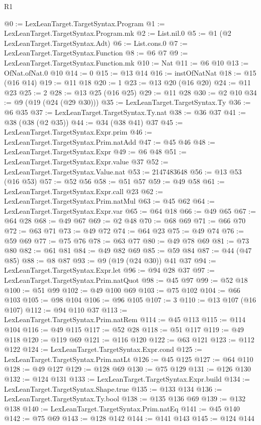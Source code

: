 \begin{lexlean}{R1}
\begin{coremodule}
@0 := LexLeanTarget.TargetSyntax.Program
@1 := LexLeanTarget.TargetSyntax.Program.mk
@2 := List.nil.{0}
@5 := @1 (@2 LexLeanTarget.TargetSyntax.Adt)
@6 := List.cons.{0}
@7 := LexLeanTarget.TargetSyntax.Function
@8 := @6 @7
@9 := LexLeanTarget.TargetSyntax.Function.mk
@10 := Nat
@11 := @6 @10
@13 := OfNat.ofNat.{0} @10
@14 := 0
@15 := @13 @14
@16 := instOfNatNat
@18 := @15 (@16 @14)
@19 := @11 @18
@20 := 1
@23 := @13 @20 (@16 @20)
@24 := @11 @23
@25 := 2
@28 := @13 @25 (@16 @25)
@29 := @11 @28
@30 := @2 @10
@34 := @9 (@19 (@24 (@29 @30)))
@35 := LexLeanTarget.TargetSyntax.Ty
@36 := @6 @35
@37 := LexLeanTarget.TargetSyntax.Ty.nat
@38 := @36 @37
@41 := @38 (@38 (@2 @35))
@44 := @34 (@38 @41) @37
@45 := LexLeanTarget.TargetSyntax.Expr.prim
@46 := LexLeanTarget.TargetSyntax.Prim.natAdd
@47 := @45 @46
@48 := LexLeanTarget.TargetSyntax.Expr
@49 := @6 @48
@51 := LexLeanTarget.TargetSyntax.Expr.value @37
@52 := LexLeanTarget.TargetSyntax.Value.nat
@53 := 2147483648
@56 := @13 @53 (@16 @53)
@57 := @52 @56
@58 := @51 @57
@59 := @49 @58
@61 := LexLeanTarget.TargetSyntax.Expr.call @23
@62 := LexLeanTarget.TargetSyntax.Prim.natMul
@63 := @45 @62
@64 := LexLeanTarget.TargetSyntax.Expr.var
@65 := @64 @18
@66 := @49 @65
@67 := @64 @28
@68 := @49 @67
@69 := @2 @48
@70 := @68 @69
@71 := @66 @70
@72 := @63 @71
@73 := @49 @72
@74 := @64 @23
@75 := @49 @74
@76 := @59 @69
@77 := @75 @76
@78 := @63 @77
@80 := @49 @78 @69
@81 := @73 @80
@82 := @61 @81
@84 := @49 @82 @69
@85 := @59 @84
@87 := @44 (@47 @85)
@88 := @8 @87
@93 := @9 (@19 (@24 @30)) @41 @37
@94 := LexLeanTarget.TargetSyntax.Expr.let
@96 := @94 @28 @37
@97 := LexLeanTarget.TargetSyntax.Prim.natQuot
@98 := @45 @97
@99 := @52 @18
@100 := @51 @99
@102 := @49 @100 @69
@103 := @75 @102
@104 := @66 @103
@105 := @98 @104
@106 := @96 @105
@107 := 3
@110 := @13 @107 (@16 @107)
@112 := @94 @110 @37
@113 := LexLeanTarget.TargetSyntax.Prim.natRem
@114 := @45 @113
@115 := @114 @104
@116 := @49 @115
@117 := @52 @28
@118 := @51 @117
@119 := @49 @118
@120 := @119 @69
@121 := @116 @120
@122 := @63 @121
@123 := @112 @122
@124 := LexLeanTarget.TargetSyntax.Expr.cond
@125 := LexLeanTarget.TargetSyntax.Prim.natLt
@126 := @45 @125
@127 := @64 @110
@128 := @49 @127
@129 := @128 @69
@130 := @75 @129
@131 := @126 @130
@132 := @124 @131
@133 := LexLeanTarget.TargetSyntax.Expr.build
@134 := LexLeanTarget.TargetSyntax.Shape.true
@135 := @133 @134
@136 := LexLeanTarget.TargetSyntax.Ty.bool
@138 := @135 @136 @69
@139 := @132 @138
@140 := LexLeanTarget.TargetSyntax.Prim.natEq
@141 := @45 @140
@142 := @75 @69
@143 := @128 @142
@144 := @141 @143
@145 := @124 @144

\end{coremodule}
\end{lexlean}
